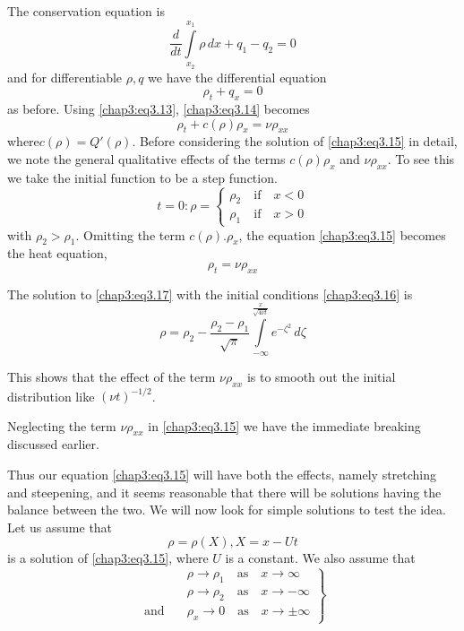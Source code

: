 The conservation equation is 
$$
\frac{d}{dt}\int\limits_{x_2}^{x_1}\rho\,dx +q_1 -q_2 =0
$$
and for differentiable $\rho,q$ we have the differential equation 
\begin{equation}
\rho_t+q_x=0\tag{3.14}\label{chap3:eq3.14}
\end{equation}
as before. Using \eqref{chap3:eq3.13}, \eqref{chap3:eq3.14} becomes 
\begin{equation}
\rho_t+c(\rho)\rho_x=\nu\rho_{xx}\tag{3.15}\label{chap3:eq3.15}
\end{equation}
where\pageoriginale $c(\rho)=Q'(\rho)$. Before considering the solution of \eqref{chap3:eq3.15} in detail, we note the general qualitative effects of the terms $c(\rho)\rho_x$ and $\nu\rho_{xx}$. To see this we take the initial function to be a step function. 
\begin{equation}
t=0:\rho=
\begin{cases}
\rho_2\quad\text{if}\quad x<0\\
\rho_1\quad\text{if}\quad x>0
\end{cases}\tag{3.16}\label{chap3:eq3.16}
\end{equation}
with $\rho_2>\rho_1$. Omitting the term $c(\rho).\rho_x$, the equation \eqref{chap3:eq3.15} becomes the heat equation,
\begin{equation}
\rho_t=\nu\rho_{xx}\tag{3.17}\label{chap3:eq3.17}
\end{equation}

The solution to \eqref{chap3:eq3.17} with the initial conditions \eqref{chap3:eq3.16} is 
\begin{equation}
\rho=\rho_2-\frac{\rho_2-\rho_1}{\sqrt{\pi}}\int\limits_{-\infty}^{\frac{x}{\sqrt{4\nu t}}} e^{-\zeta^2}\,d\zeta\tag{3.18}\label{chap3:eq3.18}
\end{equation}

This shows that the effect of the term $\nu\rho_{xx}$ is to smooth out the initial distribution like $(\nu t)^{-1/2}$. 

Neglecting the term $\nu\rho_{xx}$ in \eqref{chap3:eq3.15} we have the immediate breaking discussed earlier.

Thus our equation \eqref{chap3:eq3.15} will have both the effects, namely stretching and steepening, and it seems reasonable that there will be solutions having the balance between the two. We will now look for simple solutions to test the idea. Let us assume that 
\begin{equation}
\rho =\rho(X), X=x-Ut\tag{3.19}\label{chap3:eq3.19}
\end{equation}
is a solution of \eqref{chap3:eq3.15}, where $U$ is a constant. We also assume that
\begin{equation}
\left.
\begin{aligned}
&\rho\to\rho_1\quad\text{as}\quad x\to \infty\\
&\rho\to\rho_2\quad\text{as}\quad x\to -\infty\\
\text{and}\quad &\rho_x\to 0\quad\text{as}\quad x\to \pm\infty
\end{aligned}\tag{3.20}\label{chap3:eq3.20}
\right\}
\end{equation}\pageoriginale

